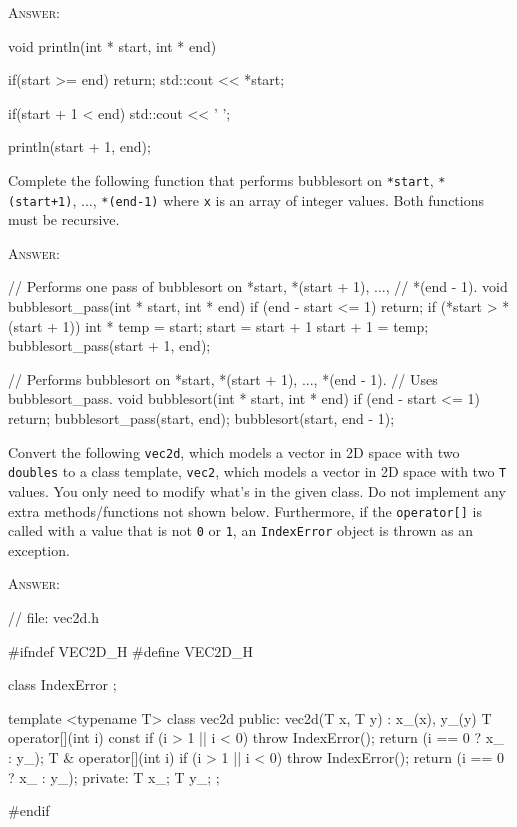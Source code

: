 \textsc{Answer:}
\begin{answercode}
void println(int * start, int * end)
{
  if(start >= end) return;
  std::cout << *start;

  if(start + 1 < end) std::cout << ' ';

  println(start + 1, end);
}
\end{answercode}

\newpage
\nextq
Complete the following function that performs bubblesort on
\verb!*start!, \verb!*(start+1)!, ..., \verb!*(end-1)!
where \verb!x! is an array of integer values.
Both functions must be recursive.

\textsc{Answer:}
\begin{answercode}
// Performs one pass of bubblesort on *start, *(start + 1), ...,
// *(end - 1).
void bubblesort_pass(int * start, int * end)
{
  if (end - start <= 1) return;
  if (*start > *(start + 1))
  {
    int * temp = start;
    start = start + 1
    start + 1 = temp;
  }
  bubblesort_pass(start + 1, end);
}

// Performs bubblesort on *start, *(start + 1), ..., *(end - 1).
// Uses bubblesort_pass.
void bubblesort(int * start, int * end)
{
  if (end - start <= 1) return;
  bubblesort_pass(start, end);
  bubblesort(start, end - 1); 
}
\end{answercode}

\newpage
\nextq
Convert the following \verb!vec2d!, which models a vector in 2D space with
two \verb!doubles! to a class template, \verb!vec2!,
which models a vector in 2D space with two \verb!T! values.
You only need to modify what's in the given class.
Do not implement any extra methods/functions not shown below.
Furthermore, if the \verb!operator[]! is called with a value that is not
\verb!0! or \verb!1!, an \verb!IndexError! object is thrown as an exception.

\textsc{Answer:}
\begin{answercode}
// file: vec2d.h

#ifndef VEC2D_H
#define VEC2D_H

class IndexError
{};

template <typename T>
class vec2d
{
public:
    vec2d(T x, T y)
        : x_(x), y_(y)
    {}
    T operator[](int i) const
    {
        if (i > 1 || i < 0) throw IndexError();
        return (i == 0 ? x_ : y_);
    }
    T & operator[](int i)
    {
        if (i > 1 || i < 0) throw IndexError();
        return (i == 0 ? x_ : y_);
    }
private:
    T x_;
    T y_;
};

#endif
\end{answercode}



